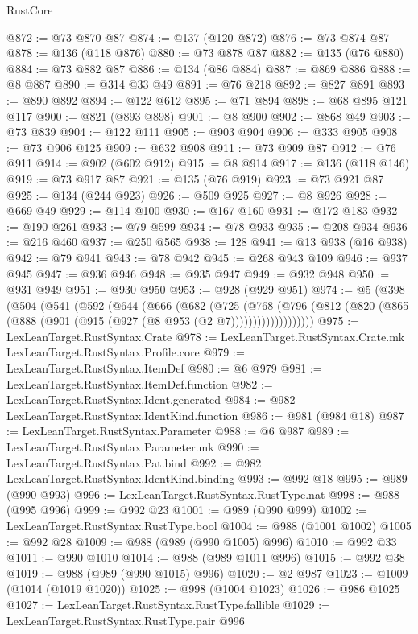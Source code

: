 \begin{lexlean}{RustCore}
\begin{coremodule}
@872 := @73 @870 @87
@874 := @137 (@120 @872)
@876 := @73 @874 @87
@878 := @136 (@118 @876)
@880 := @73 @878 @87
@882 := @135 (@76 @880)
@884 := @73 @882 @87
@886 := @134 (@86 @884)
@887 := @869 @886
@888 := @8 @887
@890 := @314 @33 @49
@891 := @76 @218
@892 := @827 @891
@893 := @890 @892
@894 := @122 @612
@895 := @71 @894
@898 := @68 @895 @121 @117
@900 := @821 (@893 @898)
@901 := @8 @900
@902 := @868 @49
@903 := @73 @839
@904 := @122 @111
@905 := @903 @904
@906 := @333 @905
@908 := @73 @906 @125
@909 := @632 @908
@911 := @73 @909 @87
@912 := @76 @911
@914 := @902 (@602 @912)
@915 := @8 @914
@917 := @136 (@118 @146)
@919 := @73 @917 @87
@921 := @135 (@76 @919)
@923 := @73 @921 @87
@925 := @134 (@244 @923)
@926 := @509 @925
@927 := @8 @926
@928 := @669 @49
@929 := @114 @100
@930 := @167 @160
@931 := @172 @183
@932 := @190 @261
@933 := @79 @599
@934 := @78 @933
@935 := @208 @934
@936 := @216 @460
@937 := @250 @565
@938 := 128
@941 := @13 @938 (@16 @938)
@942 := @79 @941
@943 := @78 @942
@945 := @268 @943 @109
@946 := @937 @945
@947 := @936 @946
@948 := @935 @947
@949 := @932 @948
@950 := @931 @949
@951 := @930 @950
@953 := @928 (@929 @951)
@974 := @5
    (@398
      (@504
        (@541
          (@592
            (@644
              (@666
                (@682
                  (@725
                    (@768
                      (@796
                        (@812 (@820 (@865 (@888 (@901 (@915 (@927 (@8 @953 (@2 @7)))))))))))))))))))
@975 := LexLeanTarget.RustSyntax.Crate
@978 := LexLeanTarget.RustSyntax.Crate.mk LexLeanTarget.RustSyntax.Profile.core
@979 := LexLeanTarget.RustSyntax.ItemDef
@980 := @6 @979
@981 := LexLeanTarget.RustSyntax.ItemDef.function
@982 := LexLeanTarget.RustSyntax.Ident.generated
@984 := @982 LexLeanTarget.RustSyntax.IdentKind.function
@986 := @981 (@984 @18)
@987 := LexLeanTarget.RustSyntax.Parameter
@988 := @6 @987
@989 := LexLeanTarget.RustSyntax.Parameter.mk
@990 := LexLeanTarget.RustSyntax.Pat.bind
@992 := @982 LexLeanTarget.RustSyntax.IdentKind.binding
@993 := @992 @18
@995 := @989 (@990 @993)
@996 := LexLeanTarget.RustSyntax.RustType.nat
@998 := @988 (@995 @996)
@999 := @992 @23
@1001 := @989 (@990 @999)
@1002 := LexLeanTarget.RustSyntax.RustType.bool
@1004 := @988 (@1001 @1002)
@1005 := @992 @28
@1009 := @988 (@989 (@990 @1005) @996)
@1010 := @992 @33
@1011 := @990 @1010
@1014 := @988 (@989 @1011 @996)
@1015 := @992 @38
@1019 := @988 (@989 (@990 @1015) @996)
@1020 := @2 @987
@1023 := @1009 (@1014 (@1019 @1020))
@1025 := @998 (@1004 @1023)
@1026 := @986 @1025
@1027 := LexLeanTarget.RustSyntax.RustType.fallible
@1029 := LexLeanTarget.RustSyntax.RustType.pair @996

\end{coremodule}
\end{lexlean}
